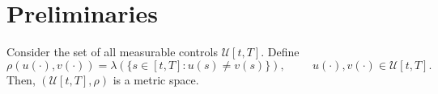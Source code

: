 \section{Preliminaries}

\begin{lemma}\label{Lemma_rhometric}
    Consider the set of all measurable controls $\mathscr{U}[t,T]$. Define
    $$
        \rho(u(\cdot), v(\cdot)) = \lambda\left(\{s \in [t, T] :  %
            u(s) \neq v(s)\} \right), \hspace{1cm} u(\cdot), v(\cdot) \in \mathscr{U}[t,T].
    $$
    Then, $(\mathscr{U}[t,T], \rho )$ is a metric space.
\end{lemma}
